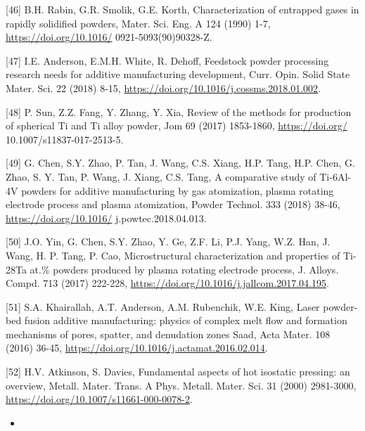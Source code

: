 \documentclass[10pt]{article}
\begin{document}
[46] B.H. Rabin, G.R. Smolik, G.E. Korth, Characterization of entrapped gases in rapidly solidified powders, Mater. Sci. Eng. A 124 (1990) 1-7, \href{https://doi.org/10.1016/}{https://doi.org/10.1016/} 0921-5093(90)90328-Z.

[47] I.E. Anderson, E.M.H. White, R. Dehoff, Feedstock powder processing research needs for additive manufacturing development, Curr. Opin. Solid State Mater. Sci. 22 (2018) 8-15, \href{https://doi.org/10.1016/j.cossms.2018.01.002}{https://doi.org/10.1016/j.cossms.2018.01.002}.

[48] P. Sun, Z.Z. Fang, Y. Zhang, Y. Xia, Review of the methods for production of spherical Ti and Ti alloy powder, Jom 69 (2017) 1853-1860, \href{https://doi.org/}{https://doi.org/} 10.1007/s11837-017-2513-5.

[49] G. Chen, S.Y. Zhao, P. Tan, J. Wang, C.S. Xiang, H.P. Tang, H.P. Chen, G. Zhao, S. Y. Tan, P. Wang, J. Xiang, C.S. Tang, A comparative study of Ti-6Al-4V powders for additive manufacturing by gas atomization, plasma rotating electrode process and plasma atomization, Powder Technol. 333 (2018) 38-46, \href{https://doi.org/10.1016/}{https://doi.org/10.1016/} j.powtec.2018.04.013.

[50] J.O. Yin, G. Chen, S.Y. Zhao, Y. Ge, Z.F. Li, P.J. Yang, W.Z. Han, J. Wang, H. P. Tang, P. Cao, Microstructural characterization and properties of Ti-28Ta at.\% powders produced by plasma rotating electrode process, J. Alloys. Compd. 713 (2017) 222-228, \href{https://doi.org/10.1016/j.jallcom.2017.04.195}{https://doi.org/10.1016/j.jallcom.2017.04.195}.

[51] S.A. Khairallah, A.T. Anderson, A.M. Rubenchik, W.E. King, Laser powder-bed fusion additive manufacturing: physics of complex melt flow and formation mechanisms of pores, spatter, and denudation zones Saad, Acta Mater. 108 (2016) 36-45, \href{https://doi.org/10.1016/j.actamat.2016.02.014}{https://doi.org/10.1016/j.actamat.2016.02.014}.

[52] H.V. Atkinson, S. Davies, Fundamental aspects of hot isostatic pressing: an overview, Metall. Mater. Trans. A Phys. Metall. Mater. Sci. 31 (2000) 2981-3000, \href{https://doi.org/10.1007/s11661-000-0078-2}{https://doi.org/10.1007/s11661-000-0078-2}.

\begin{itemize}
  \item 
\end{itemize}
\end{document}
